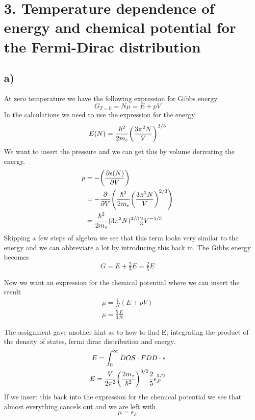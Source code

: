 \documentclass{article}
\begin{document}
\newpage
\section*{3. Temperature dependence of energy and chemical potential for the Fermi-Dirac distribution}
\subsection*{a)}
At zero temperature we have the following expression for Gibbs energy
\begin{equation*}
	G_{T=0}=N\mu=E+pV
\end{equation*}
In the calculations we need to use the expression for the energy
\begin{equation}
	E(N) = \frac{\hbar^2}{2m_e}\qty(\frac{3\pi^2N}{V})^{2/3}
\end{equation}
We want to insert the pressure and we can get this by volume derivating the energy.
\begin{align*}
	p &= -\qty(\pdv{\epsilon(N)}{V})\\
	&=-\pdv{}{V}\qty( \frac{\hbar^2}{2m_e}\qty(\frac{3\pi^2N}{V})^{2/3}  )\\
	&= \frac{\hbar^2}{2m_e}(3\pi^2N)^{2/3} \tfrac{2}{3}V^{-5/3}
\end{align*}
Skipping a few steps of algebra we see that this term looks very similar to the energy and we can abbreviate a lot by introducing this back in. The Gibbs energy becomes
\begin{equation*}
	G = E + \tfrac{2}{3}E = \tfrac{2}{5}E
\end{equation*}

Now we want an expression for the chemical potential where we can insert the result
\begin{align*}
	\mu = \frac{1}{N}(E+pV)\\
	\mu = \frac{5}{3}\frac{E}{N}
\end{align*}

The assignment gave another hint as to how to find E; integrating the product of the density of states, fermi dirac distribution and energy. 
\begin{align*}
	E = \int_0^\infty DOS\cdot FDD\cdot \epsilon \\
	E = \frac{V}{2\pi^2}\qty(\frac{2m_e}{\hbar^2})^{3/2}\frac{2}{5}\epsilon_F^{5/2}
\end{align*}
If we insert this back into the expression for the chemical potential we see that almost everything cancels out and we are left with
\begin{equation}
	\mu = \epsilon_F
\end{equation}
\end{document}
